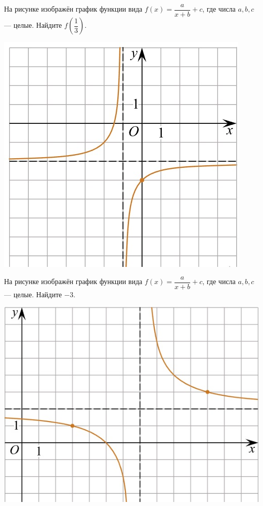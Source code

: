\begin{class}[number=5]
\begin{listofex}
\begin{minipage}[c]{0.1\textwidth}
		\end{minipage}
		\item
		\begin{minipage}[t]{0.43\textwidth}
			На рисунке изображён график функции вида \(f(x)=\dfrac{a}{x+b}+c\), где числа \(a, b, c\) --- целые. Найдите \(f\left(\dfrac{1}{3}\right)\).
		\end{minipage}
		\begin{minipage}[c]{0.1\textwidth}
			\includegraphics[align=t, width=\textwidth]{pics/G111M4C5-1.jpg}
		\end{minipage}
		\item
		\begin{minipage}[t]{0.43\textwidth}
			На рисунке изображён график функции вида \(f(x)=\dfrac{a}{x+b}+c\), где числа \(a, b, c\) --- целые. Найдите \(-3\).
		\end{minipage}
		\begin{minipage}[c]{0.1\textwidth}
			\includegraphics[align=t, width=\textwidth]{pics/G111M4C5-2.jpg}

\end{minipage}
\end{listofex}
\end{class}
